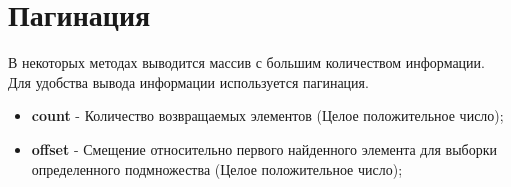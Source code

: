 \section{Пагинация}
\par
В некоторых методах выводится массив с большим количеством информации. Для удобства вывода информации используется пагинация.


\begin{itemize}

  \item \textbf{count} - Количество возвращаемых элементов (Целое положительное число);
  \item \textbf{offset} - Смещение относительно первого найденного элемента для выборки определенного подмножества (Целое положительное число);
\end{itemize}
